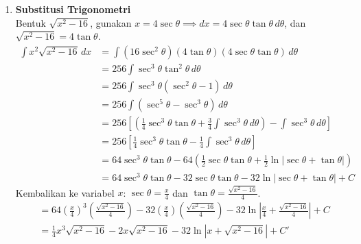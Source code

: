 \documentclass[a4paper,12pt]{article}
\begin{document}
\begin{enumerate}
  \item \textbf{Substitusi Trigonometri} \\
        Bentuk $\sqrt{x^2-16}$, gunakan $x = 4\sec\theta \implies dx = 4\sec\theta\tan\theta\,d\theta$, dan $\sqrt{x^2-16} = 4\tan\theta$.
        \begin{align*}
          \int x^2\sqrt{x^2-16}\,dx &= \int (16\sec^2\theta)(4\tan\theta)(4\sec\theta\tan\theta)\,d\theta \\
          &= 256 \int \sec^3\theta\tan^2\theta\,d\theta \\
          &= 256 \int \sec^3\theta(\sec^2\theta - 1)\,d\theta \\
          &= 256 \int (\sec^5\theta - \sec^3\theta)\,d\theta \\
          &= 256 \left[ \left(\frac{1}{4}\sec^3\theta\tan\theta + \frac{3}{4}\int \sec^3\theta\,d\theta\right) - \int \sec^3\theta\,d\theta \right] \\
          &= 256 \left[ \frac{1}{4}\sec^3\theta\tan\theta - \frac{1}{4}\int \sec^3\theta\,d\theta \right] \\
          &= 64\sec^3\theta\tan\theta - 64\left( \frac{1}{2}\sec\theta\tan\theta + \frac{1}{2}\ln|\sec\theta+\tan\theta| \right) \\
          &= 64\sec^3\theta\tan\theta - 32\sec\theta\tan\theta - 32\ln|\sec\theta+\tan\theta| + C
        \end{align*}
        Kembalikan ke variabel $x$: $\sec\theta = \frac{x}{4}$ dan $\tan\theta = \frac{\sqrt{x^2-16}}{4}$.
        \begin{align*}
          &= 64\left(\frac{x}{4}\right)^3\left(\frac{\sqrt{x^2-16}}{4}\right) - 32\left(\frac{x}{4}\right)\left(\frac{\sqrt{x^2-16}}{4}\right) - 32\ln\left|\frac{x}{4} + \frac{\sqrt{x^2-16}}{4}\right| + C \\
          &= \frac{1}{4}x^3\sqrt{x^2-16} - 2x\sqrt{x^2-16} - 32\ln\left|x + \sqrt{x^2-16}\right| + C'
        \end{align*}


\end{enumerate}
\end{document}
